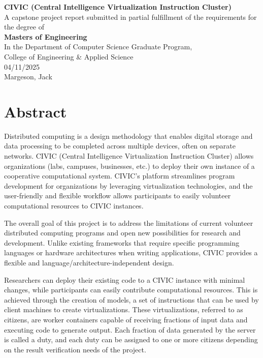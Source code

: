 \documentclass[11pt]{article}
\begin{document}
\thispagestyle{empty}
\begin{titlepage}
    \begin{center}
        \textbf{\Large CIVIC (Central Intelligence Virtualization Instruction Cluster)} \\[1cm]
        A capstone project report submitted in partial fulfillment of the requirements for the degree of \\[1cm]
        \textbf{\Large Masters of Engineering} \\[1cm]
        In the Department of Computer Science Graduate Program, \\
        College of Engineering \& Applied Science \\[1cm]
        04/11/2025 \\[1cm]
        Margeson, Jack
    \end{center}
\end{titlepage}

\setcounter{page}{2}
\section{Abstract}

Distributed computing is a design methodology that enables digital storage and data processing to be completed across multiple devices, often on separate networks. CIVIC (Central Intelligence Virtualization Instruction Cluster) allows organizations (labs, campuses, businesses, etc.) to deploy their own instance of a cooperative computational system. CIVIC’s platform streamlines program development for organizations by leveraging virtualization technologies, and the user-friendly and flexible workflow allows participants to easily volunteer computational resources to CIVIC instances.

The overall goal of this project is to address the limitations of current volunteer distributed computing programs and open new possibilities for research and development. Unlike existing frameworks that require specific programming languages or hardware architectures when writing applications, CIVIC provides a flexible and language/architecture-independent design.

Researchers can deploy their existing code to a CIVIC instance with minimal changes, while participants can easily contribute computational resources. This is achieved through the creation of models, a set of instructions that can be used by client machines to create virtualizations. These virtualizations, referred to as citizens, are worker containers capable of receiving fractions of input data and executing code to generate output. Each fraction of data generated by the server is called a duty, and each duty can be assigned to one or more citizens depending on the result verification needs of the project.
\end{document}

